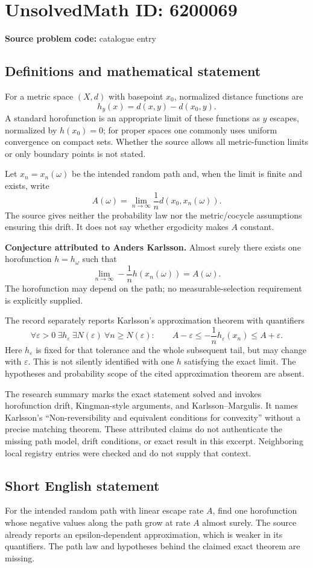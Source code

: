 \documentclass[11pt]{article}
\begin{document}
\section*{UnsolvedMath ID: 6200069}
\textbf{Source problem code:} catalogue entry
\subsection{Definitions and mathematical statement}
For a metric space $(X,d)$ with basepoint $x_0$, normalized distance functions are
\[
 h_y(x)=d(x,y)-d(x_0,y).
\]
A standard horofunction is an appropriate limit of these functions as $y$ escapes, normalized by $h(x_0)=0$; for proper spaces one commonly uses uniform convergence on compact sets. Whether the source allows all metric-function limits or only boundary points is not stated.

Let $x_n=x_n(\omega)$ be the intended random path and, when the limit is finite and exists, write
\[
 A(\omega)=\lim_{n\to\infty}\frac1n d(x_0,x_n(\omega)).
\]
The source gives neither the probability law nor the metric/cocycle assumptions ensuring this drift. It does not say whether ergodicity makes $A$ constant.

\textbf{Conjecture attributed to Anders Karlsson.} Almost surely there exists one horofunction $h=h_\omega$ such that
\[
 \lim_{n\to\infty}-\frac1n h(x_n(\omega))=A(\omega).
\]
The horofunction may depend on the path; no measurable-selection requirement is explicitly supplied.

The record separately reports Karlsson's approximation theorem with quantifiers
\[
 \forall\varepsilon>0\ \exists h_\varepsilon\ \exists N(\varepsilon)\ 
 \forall n\geq N(\varepsilon):\qquad
 A-\varepsilon\leq-\frac1n h_\varepsilon(x_n)\leq A+\varepsilon.
\]
Here $h_\varepsilon$ is fixed for that tolerance and the whole subsequent tail, but may change with $\varepsilon$. This is not silently identified with one $h$ satisfying the exact limit. The hypotheses and probability scope of the cited approximation theorem are absent.

The research summary marks the exact statement solved and invokes horofunction drift, Kingman-style arguments, and Karlsson--Margulis. It names Karlsson's ``Non-reversibility and equivalent conditions for convexity'' without a precise matching theorem. These attributed claims do not authenticate the missing path model, drift conditions, or exact result in this excerpt. Neighboring local registry entries were checked and do not supply that context.
\subsection{Short English statement}
For the intended random path with linear escape rate $A$, find one horofunction whose negative values along the path grow at rate $A$ almost surely. The source already reports an epsilon-dependent approximation, which is weaker in its quantifiers. The path law and hypotheses behind the claimed exact theorem are missing.
\end{document}
